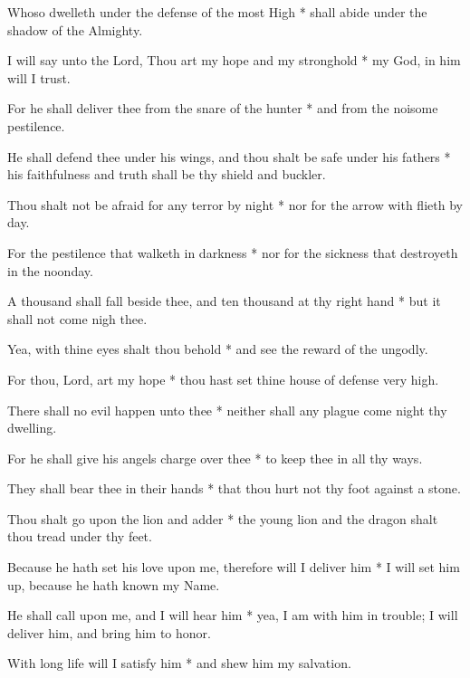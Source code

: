 \begin{multicols}{2}
	
	Whoso dwelleth under the defense of the most High * shall abide under the shadow of the Almighty.
	
	I will say unto the Lord, Thou art my hope and my stronghold * my God, in him will I trust.
	
	For he shall deliver thee from the snare of the hunter * and from the noisome pestilence.
	
	He shall defend thee under his wings, and thou shalt be safe under his fathers * his faithfulness and truth shall be thy shield and buckler.
	
	Thou shalt not be afraid for any terror by night * nor for the arrow with flieth by day.
	
	For the pestilence that walketh in darkness * nor for the sickness that destroyeth in the noonday.
	
	A thousand shall fall beside thee, and ten thousand at thy right hand * but it shall not come nigh thee.
	
	Yea, with thine eyes shalt thou behold * and see the reward of the ungodly.
	
	For thou, Lord, art my hope * thou hast set thine house of defense very high.
	
	There shall no evil happen unto thee * neither shall any plague come night thy dwelling.
	
	For he shall give his angels charge over thee * to keep thee in all thy ways.
	
	They shall bear thee in their hands * that thou hurt not thy foot against a stone.
	
	Thou shalt go upon the lion and adder * the young lion and the dragon shalt thou tread under thy feet.
	
	Because he hath set his love upon me, therefore will I deliver him * I will set him up, because he hath known my Name.
	
	He shall call upon me, and I will hear him * yea, I am with him in trouble; I will deliver him, and bring him to honor.
	
	With long life will I satisfy him * and shew him my salvation.
	
	\gloria{}
\end{multicols}